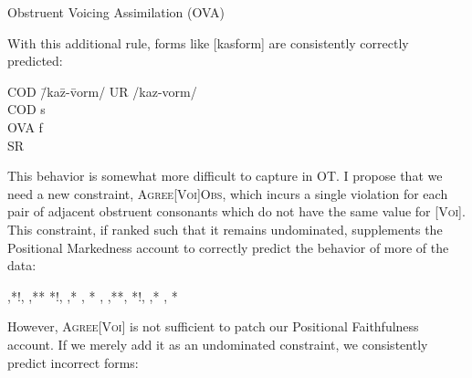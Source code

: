 \documentclass[doc,12pt]{apa6}
\begin{document}
\begin{exe}
	\ex Obstruent Voicing Assimilation (OVA) \\
\end{exe}

\noindent

With this additional rule, forms like [kasform] are consistently correctly
predicted:

\begin{minipage}{\textwidth}
\begin{exe}
	\ex \begin{tabbing}
		COD \= /ka\=z-\=vorm/ \kill
		UR  \> /kaz-vorm/ \\
		COD \> \>s \\
		OVA \> \> \>f \\
		SR  \> [kasform]
	\end{tabbing}
\end{exe}
\end{minipage}

\noindent

This behavior is somewhat more difficult to capture in OT. I propose that we
need a new constraint, \textsc{Agree[Voi]Obs}, which incurs a single violation
for each pair of adjacent obstruent consonants which do not have the same value
for [\textsc{Voi}]. This constraint, if ranked such that it remains
undominated, supplements the Positional Markedness account to correctly predict
the behavior of more of the data:

\begin{center}
\begin{OTtableau}{4}
	 {  ,*!,  ,**}
	 {*!,  ,* , *}
	 {  ,  ,**, }
	 {*!,  ,* , *}
\end{OTtableau}
\end{center}

\noindent

However, \textsc{Agree[Voi]} is not sufficient to patch our Positional
Faithfulness account. If we merely add it as an undominated constraint, we
consistently predict incorrect forms:
\end{document}
